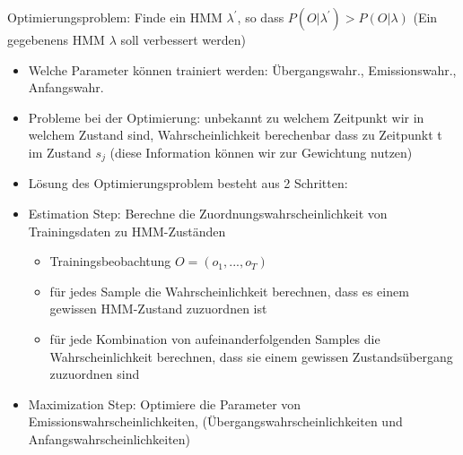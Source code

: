 \documentclass[a4paper,10pt,oneside]{article}
\begin{document}
Optimierungsproblem: Finde ein HMM $\lambda^{'}$, so dass $P(O|\lambda^{'})> P(O|\lambda)$ (Ein gegebenens HMM $\lambda$ soll verbessert werden)
	\begin{itemize}
		\item Welche Parameter können trainiert werden: Übergangswahr., Emissionswahr., Anfangswahr.
		\item Probleme bei der Optimierung: unbekannt zu welchem Zeitpunkt wir in welchem Zustand sind, Wahrscheinlichkeit berechenbar dass zu Zeitpunkt t im Zustand $s_j$ (diese Information können wir zur Gewichtung nutzen)
		\item Lösung des Optimierungsproblem besteht aus 2 Schritten:
		\item Estimation Step: Berechne die Zuordnungswahrscheinlichkeit von Trainingsdaten zu HMM-Zuständen
			\begin{itemize}
				\item Trainingsbeobachtung $O=(o_1,...,o_T)$
				\item für jedes Sample die Wahrscheinlichkeit berechnen, dass es einem gewissen HMM-Zustand zuzuordnen ist
				\item für jede Kombination von aufeinanderfolgenden Samples die Wahrscheinlichkeit berechnen, dass sie einem gewissen Zustandsübergang zuzuordnen sind
			\end{itemize}
		\item Maximization Step: Optimiere die Parameter von Emissionswahrscheinlichkeiten, (Übergangswahrscheinlichkeiten und Anfangswahrscheinlichkeiten)
	\end{itemize}
 
\end{document}
